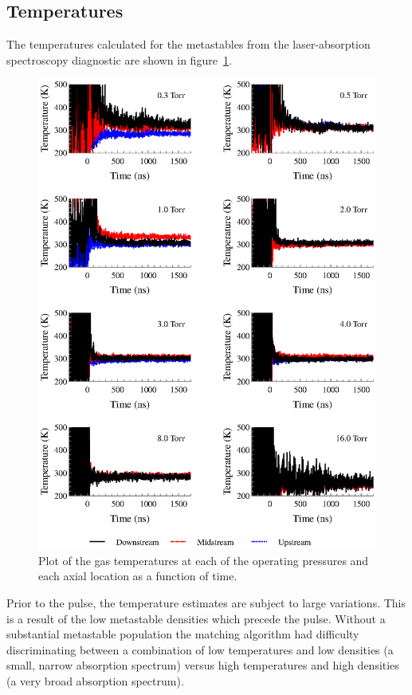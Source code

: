 \subsection{Temperatures}

The temperatures calculated for the metastables from the laser-absorption
spectroscopy diagnostic are shown in figure~\ref{fig:temperatures}.
\begin{figure}
  \centering
  \includegraphics{./chapters/metastables/figures/temperatures.eps}
  \caption{Plot of the gas temperatures at each of the operating
  pressures and each axial location as a function of time.}
  \label{fig:temperatures}
\end{figure}
Prior to the pulse, the temperature estimates are subject to large variations.
This is a result of the low metastable densities which precede the pulse.
Without a substantial metastable population the matching algorithm had
difficulty discriminating between a combination of low temperatures and low
densities (a small, narrow absorption spectrum) versus high temperatures and high
densities (a very broad absorption spectrum).

